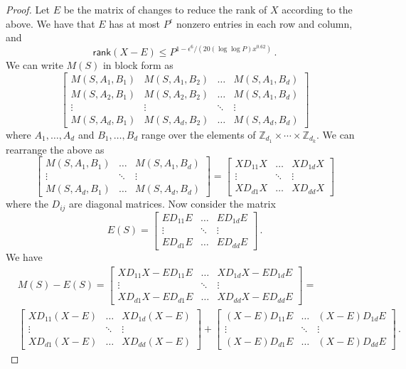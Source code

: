 \documentclass[11pt]{article}
\numberwithin{equation}{section}
\theoremstyle{definition}
\theoremstyle{plain}
\newcommand{\Z}{\mathbb Z}
\theoremstyle{definition}
\renewcommand\Z{{\mathbb{Z}}}
\newcommand\rank{\textsf{rank}}
\begin{document}
\begin{proof}
Let $E$ be the matrix of changes to reduce the rank of $X$ according to the above.  We have that $E$ has at most $P^{\epsilon}$ nonzero entries in each row and column, and  
\[
\rank(X - E) \leq P^{1 - \epsilon^6/(20(\log \log P) x^{0.62})} \,.
\]
We can write $M(S)$ in block form as 
\[
\begin{bmatrix}
M(S,A_1,B_1) &  M(S,A_1, B_2) &  \dots & M(S, A_1, B_d)\\
M(S, A_2, B_1) & M(S, A_2, B_2) & \dots &  M(S, A_1, B_d)\\
\vdots & \vdots & \ddots & \vdots \\
M(S, A_d, B_1) & M(S, A_d, B_2) & \dots & M(S, A_d, B_d)
\end{bmatrix}
\]
where $A_1, \dots , A_d$ and $B_1, \dots , B_d$ range over the elements of $\Z_{d_1} \times \cdots \times \Z_{d_k}$.  We can rearrange the above as 
\[
\begin{bmatrix}
M(S,A_1,B_1) &  \dots & M(S, A_1, B_d)\\
\vdots  & \ddots & \vdots \\
M(S, A_d, B_1)  & \dots & M(S, A_d, B_d)
\end{bmatrix} = 
\begin{bmatrix}
XD_{11}X &  \dots & XD_{1d}X\\
\vdots  & \ddots & \vdots \\
XD_{d1}X  & \dots & XD_{dd}X
\end{bmatrix}
\]
where the $D_{ij}$ are diagonal matrices.  Now consider the matrix
\[
E(S) = 
\begin{bmatrix}
 ED_{11}E &  \dots & ED_{1d}E\\
\vdots  & \ddots & \vdots \\
ED_{d1}E  & \dots & ED_{dd}E
\end{bmatrix} \,.
\]
We have
\begin{align*}
&M(S) - E(S) = 
\begin{bmatrix}
XD_{11}X - ED_{11}E &  \dots & XD_{1d}X - ED_{1d}E\\
\vdots  & \ddots & \vdots \\
XD_{d1}X - ED_{d1}E  & \dots & XD_{dd}X - ED_{dd}E
\end{bmatrix}
= \\
&\begin{bmatrix}
XD_{11}(X - E)  &  \dots & XD_{1d}(X - E) \\
\vdots  & \ddots & \vdots \\
XD_{d1}(X - E)    & \dots & XD_{dd}(X - E)  
\end{bmatrix}  + 
\begin{bmatrix}
 (X-E)D_{11}E & \dots &  (X-E)D_{1d}E \\
 \vdots  & \ddots & \vdots  \\
 (X-E)D_{d1}E & \dots & (X-E)D_{dd}E
\end{bmatrix} \,.
\end{align*}


\end{proof}
\end{document}
